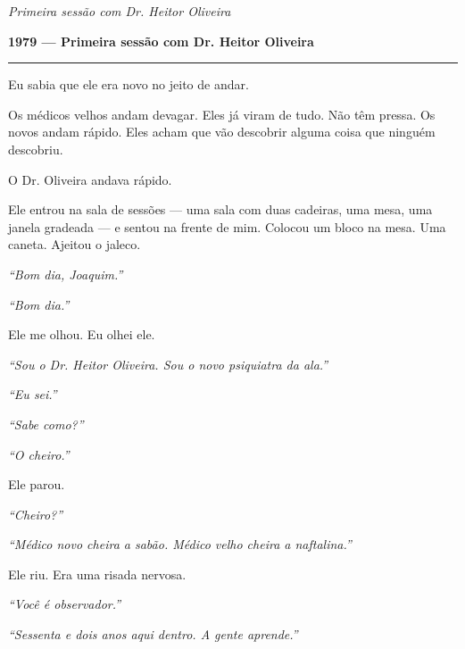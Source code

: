 
\noindent \textit{Primeira sessão com Dr. Heitor Oliveira}

\noindent \textbf{1979 --- Primeira sessão com Dr. Heitor Oliveira}

\vspace{0.5em}\noindent\rule{\textwidth}{0.5pt}\vspace{0.5em}

\noindent Eu sabia que ele era novo no jeito de andar.

\noindent Os médicos velhos andam devagar. Eles já viram de tudo. Não têm pressa. Os novos andam rápido. Eles acham que vão descobrir alguma coisa que ninguém descobriu.

\noindent O Dr. Oliveira andava rápido.

\noindent Ele entrou na sala de sessões --- uma sala com duas cadeiras, uma mesa, uma janela gradeada --- e sentou na frente de mim. Colocou um bloco na mesa. Uma caneta. Ajeitou o jaleco.

\noindent \textit{\textquotedblleft{}Bom dia, Joaquim.\textquotedblright{}}

\noindent \textit{\textquotedblleft{}Bom dia.\textquotedblright{}}

\noindent Ele me olhou. Eu olhei ele.

\noindent \textit{\textquotedblleft{}Sou o Dr. Heitor Oliveira. Sou o novo psiquiatra da ala.\textquotedblright{}}

\noindent \textit{\textquotedblleft{}Eu sei.\textquotedblright{}}

\noindent \textit{\textquotedblleft{}Sabe como?\textquotedblright{}}

\noindent \textit{\textquotedblleft{}O cheiro.\textquotedblright{}}

\noindent Ele parou.

\noindent \textit{\textquotedblleft{}Cheiro?\textquotedblright{}}

\noindent \textit{\textquotedblleft{}Médico novo cheira a sabão. Médico velho cheira a naftalina.\textquotedblright{}}

\noindent Ele riu. Era uma risada nervosa.

\noindent \textit{\textquotedblleft{}Você é observador.\textquotedblright{}}

\noindent \textit{\textquotedblleft{}Sessenta e dois anos aqui dentro. A gente aprende.\textquotedblright{}}

